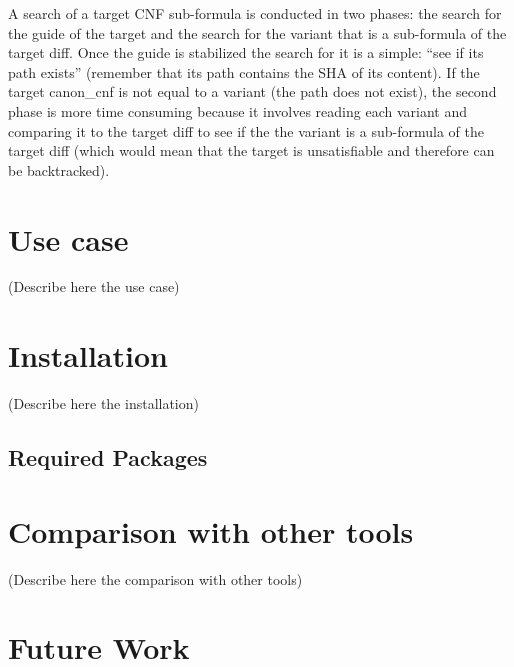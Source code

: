 \documentclass{easychair}
\begin{document}
A search of a target CNF sub-formula is conducted in two phases: the search for the guide of the target and the search for the variant that is a sub-formula of the target diff. Once the guide is stabilized the search for it is a simple: “see if its path exists” (remember that its path contains the SHA of its content). If the target canon\_cnf is not equal to a variant (the path does not exist), the second phase is more time consuming because it involves reading each variant and comparing it to the target diff to see if the the variant is a sub-formula of the target diff (which would mean that the target is unsatisfiable and therefore can be backtracked).



\section{Use case}
\label{sect:use-case}

(Describe here the use case)


\section{Installation}
\label{sect:installation}

(Describe here the installation)

\subsection{Required Packages}


\section{Comparison with other tools}
\label{sect:comparison}

(Describe here the comparison with other tools)

\section{Future Work}
\label{sect:future-work}
\end{document}
